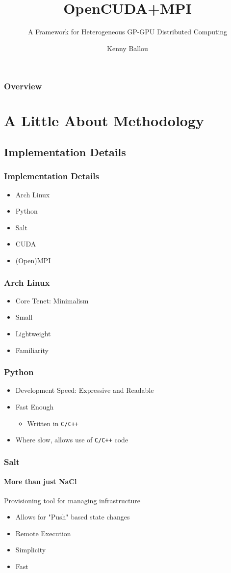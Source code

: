 \documentclass{beamer}
\title{OpenCUDA+MPI}
\subtitle{A Framework for Heterogeneous GP-GPU Distributed Computing}
\author[Ballou]{Kenny Ballou}
\begin{document}
\begin{frame}[label=titleslide]
\titlepage
\end{frame}
\begin{frame}
\frametitle{Overview}
\tableofcontents
\end{frame}
\section{A Little About Methodology}
\begin{frame}
\tableofcontents[currentsection]
\end{frame}
\subsection{Implementation Details}
\begin{frame}
\frametitle{Implementation Details}
\begin{itemize}
\item{Arch Linux}
\item{Python}
\item{Salt}
\item{CUDA}
\item{(Open)MPI}
\end{itemize}
\end{frame}
\begin{frame}
\frametitle{Arch Linux}
\begin{itemize}
\item{Core Tenet: Minimalism}
\item{Small}
\item{Lightweight}
\item{Familiarity}
\end{itemize}
\end{frame}
\begin{frame}
\frametitle{Python}
\begin{itemize}
\item{Development Speed: Expressive and Readable}
\item{Fast Enough}
\begin{itemize}
\item{Written in \texttt{C/C++}}
\end{itemize}
\item{Where slow, allows use of \texttt{C/C++} code}
\end{itemize}
\end{frame}
\begin{frame}
\frametitle{Salt}
\framesubtitle{More than just NaCl}
Provisioning tool for managing infrastructure
\begin{itemize}
\item{Allows for "Push" based state changes}
\item{Remote Execution}
\item{Simplicity}
\item{Fast}
\end{itemize}
\end{frame}
\end{document}
